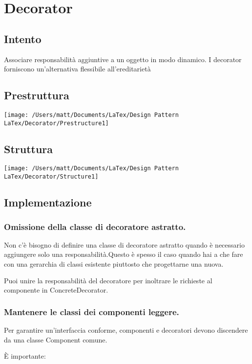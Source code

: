 \chapter{Decorator}
\section{Intento}

Associare responsabilità aggiuntive a un oggetto in modo dinamico. I decorator forniscono un'alternativa flessibile all'ereditarietà


\section{Prestruttura}

\texttt{[image: /Users/matt/Documents/LaTex/Design Pattern LaTex/Decorator/Prestructure1]}


\section{Struttura}

\texttt{[image: /Users/matt/Documents/LaTex/Design Pattern LaTex/Decorator/Structure1]}


\section{Implementazione}

\subsection{Omissione della classe di decoratore astratto.}
Non c'è bisogno di definire una classe di decoratore astratto quando è necessario aggiungere solo una responsabilità.Questo è spesso il caso quando hai a che fare con una gerarchia di classi esistente piuttosto che progettarne una nuova.

Puoi unire la responsabilità del decoratore per inoltrare le richieste al componente in ConcreteDecorator.

\subsection{Mantenere le classi dei componenti leggere.}
Per garantire un'interfaccia conforme, componenti e decoratori devono discendere da una classe Component comune.

È importante:

